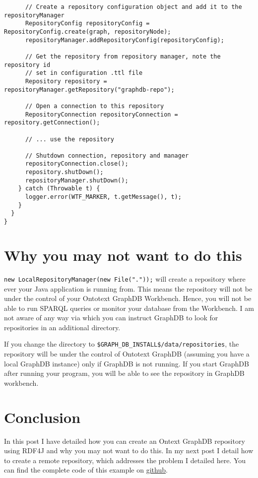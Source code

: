 \documentclass{amsart}
\begin{document}
\begin{small}
\begin{verbatim}
      // Create a repository configuration object and add it to the repositoryManager
      RepositoryConfig repositoryConfig = RepositoryConfig.create(graph, repositoryNode);
      repositoryManager.addRepositoryConfig(repositoryConfig);

      // Get the repository from repository manager, note the repository id 
      // set in configuration .ttl file
      Repository repository = repositoryManager.getRepository("graphdb-repo");

      // Open a connection to this repository
      RepositoryConnection repositoryConnection = repository.getConnection();

      // ... use the repository

      // Shutdown connection, repository and manager
      repositoryConnection.close();
      repository.shutDown();
      repositoryManager.shutDown();					
    } catch (Throwable t) {
      logger.error(WTF_MARKER, t.getMessage(), t);
    }		
  }
}   
  \end{verbatim}
  \end{small}

  
  
  \section{Why you may not want to do this}
  \texttt{new LocalRepositoryManager(new File("."));} will create a repository where ever your Java application is running from. This means the repository will not be under the control of your Ontotext GraphDB Workbench. Hence, you will not be able to run SPARQL queries or monitor your database from the Workbench. I am not aware of any way via which you can instruct GraphDB to look for repositories in an additional directory.

  If you change the directory to \texttt{\$GRAPH\_DB\_INSTALL\$/data/repositories}, the repository will be under the control of Ontotext GraphDB (assuming you have a local GraphDB instance) only if GraphDB is not running. If you start GraphDB after running your program, you will be able to see the repository in GraphDB workbench.  
  
  \section{Conclusion}
  In this post I have detailed how you can create an Ontext GraphDB repository using RDF4J and why you may not want to do this. In my next post I detail how to create a remote repository, which addresses the problem I detailed here. You can find the complete code of this example on \href{https://github.com/henrietteharmse/henrietteharmse/tree/master/blog/tutorial/graphdb/source/rdf4j}{github}.
  
  
  
 
\end{document}
